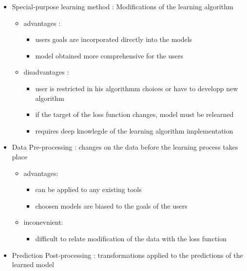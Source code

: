 \documentclass[
]{report}
\providecommand{\tightlist}{%
  \setlength{\itemsep}{0pt}\setlength{\parskip}{0pt}}
\begin{document}
\begin{itemize}
\tightlist
\item
  Special-purpose learning method : Modifications of the learning algorithm

  \begin{itemize}
  \tightlist
  \item
    advantages :

    \begin{itemize}
    \tightlist
    \item
      users goals are incorporated directly into the models
    \item
      model obtained more comprehensive for the users
    \end{itemize}
  \item
    disadvantages :

    \begin{itemize}
    \tightlist
    \item
      user is restricted in his algorithmm choices or have to developp new algorithm
    \item
      if the target of the loss function changes, model must be relearned
    \item
      requires deep knowlegde of the learning algorithm implementation
    \end{itemize}
  \end{itemize}
\item
  Data Pre-processing : changes on the data before the learning process takes place

  \begin{itemize}
  \tightlist
  \item
    advantages:

    \begin{itemize}
    \tightlist
    \item
      can be applied to any existing tools
    \item
      choosen models are biased to the goals of the users
    \end{itemize}
  \item
    inconevnient:

    \begin{itemize}
    \tightlist
    \item
      difficult to relate modification of the data with the loss function
    \end{itemize}
  \end{itemize}
\item
  Prediction Post-processing : transformations applied to the predictions of the learned model


\end{itemize}
\end{document}
